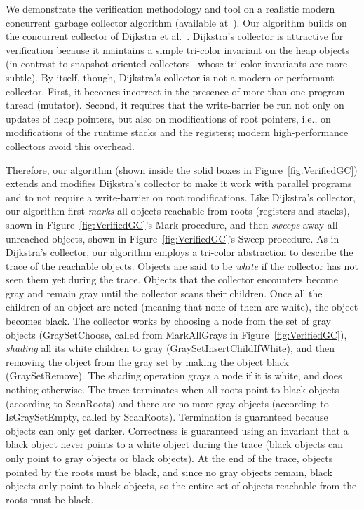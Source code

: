 We demonstrate the verification methodology and tool on a realistic modern concurrent garbage collector algorithm (available at~\cite{GC}).
Our algorithm builds on the concurrent collector of Dijkstra et al.~\cite{dijk78}.
Dijkstra's collector is attractive for verification because it maintains a simple tri-color invariant
on the heap objects (in contrast to snapshot-oriented collectors~\cite{doli93,doli94,doma00,azat03}
whose tri-color invariants are more subtle).
By itself, though, Dijkstra's collector is not a modern or performant collector.
First, it becomes incorrect in the presence of more than one program thread (mutator).
Second, it requires that the write-barrier be run not only on updates of heap pointers,
but also on modifications of root pointers, i.e., on modifications of the runtime stacks and the registers;
modern high-performance collectors avoid this overhead.

Therefore, our algorithm (shown inside the solid boxes in Figure~\ref{fig:VerifiedGC}) extends and modifies Dijkstra's collector
to make it work with parallel programs and to not require a write-barrier on root modifications.
Like Dijkstra's collector, our algorithm first {\em marks} all objects reachable from roots (registers and stacks),
shown in Figure~\ref{fig:VerifiedGC}'s Mark procedure, and then {\em sweeps} away all unreached objects,
shown in Figure~\ref{fig:VerifiedGC}'s Sweep procedure.
As in Dijkstra's collector, our algorithm employs a tri-color abstraction to describe the trace of the reachable objects.
Objects are said to be {\em white} if the collector has not seen them yet during the trace.
Objects that the collector encounters become gray and remain gray until the collector scans their children.
Once all the children of an object are noted (meaning that none of them are white), the object becomes black.
The collector works by choosing a node from the set of gray objects (GraySetChoose, called from MarkAllGrays in Figure~\ref{fig:VerifiedGC}),
{\em shading} all its white children to gray (GraySetInsertChildIfWhite), and then removing the object from the gray set by making the object black (GraySetRemove).
The shading operation grays a node if it is white, and does nothing otherwise.
The trace terminates when all roots point to black objects (according to ScanRoots)
and there are no more gray objects (according to IsGraySetEmpty, called by ScanRoots).
Termination is guaranteed because objects can only get darker.
Correctness is guaranteed using an invariant that a black object never points to a white object during the trace
(black objects can only point to gray objects or black objects).
At the end of the trace, objects pointed by the roots must be black, and since no gray objects remain,
black objects only point to black objects,
so the entire set of objects reachable from the roots must be black.

